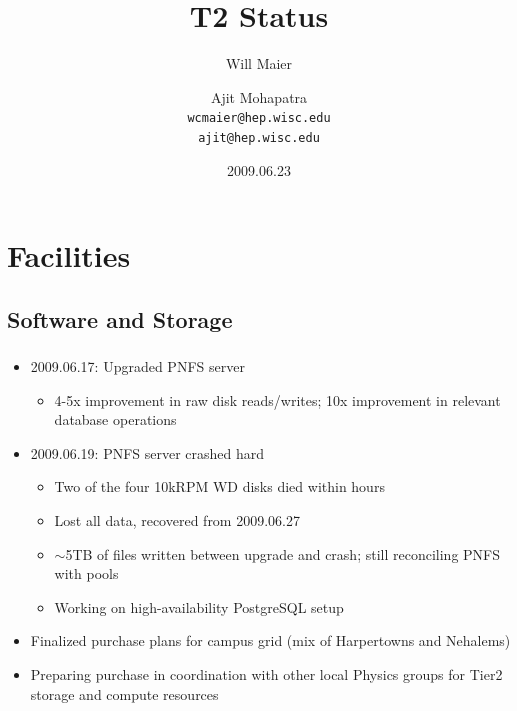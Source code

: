 \documentclass{beamer}
\title{T2 Status}
\author[Maier, Mohapatra]{
    Will Maier \and Ajit Mohapatra\\ 
    {\tt wcmaier@hep.wisc.edu}\\
    {\tt ajit@hep.wisc.edu}}
\institute[Wisconsin]{University of Wisconsin - High Energy Physics}
\date{2009.06.23}
\newcommand{\ca}{\ensuremath{\sim}}
\begin{document}
\begin{frame}
    \titlepage
\end{frame}


\section{Facilities}
\subsection{Software and Storage}
\begin{frame}
\frametitle{}
\begin{itemize}
	\item 2009.06.17: Upgraded PNFS server
	\begin{itemize}
		\item 4-5x improvement in raw disk reads/writes; 10x improvement in relevant database operations
	\end{itemize}
	\item 2009.06.19: PNFS server crashed hard
	\begin{itemize}
		\item Two of the four 10kRPM WD disks died within hours
		\item Lost all data, recovered from 2009.06.27
		\item \ca{}5TB of files written between upgrade and crash; still reconciling PNFS with pools
		\item Working on high-availability PostgreSQL setup
	\end{itemize}
	\item Finalized purchase plans for campus grid (mix of Harpertowns and Nehalems)
	\item Preparing purchase in coordination with other local Physics groups for Tier2 storage and compute resources
\end{itemize}

\end{frame}
\end{document}
